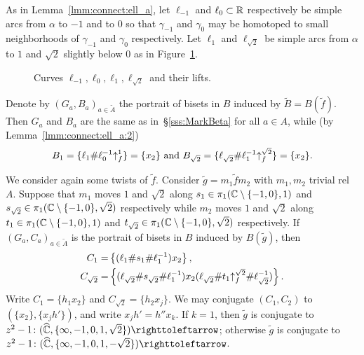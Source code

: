 \documentclass{amsart}
\newcommand\wtf{{\widetilde f}}
\newcommand\wtg{{\widetilde g}}
\newcommand\wtA{{\widetilde A}}
\newcommand\wtB{{\widetilde B}}
\begin{document}
As in Lemma~\ref{lmm:connect:ell_a}, let $\ell_{-1}$ and
$\ell_0\subset {\mathbb R}$ respectively be simple arcs from $\alpha$ to $-1$
and to $0$ so that $\gamma_{-1}$ and $\gamma_0$ may be homotoped to
small neighborhoods of $\gamma_{-1}$ and $\gamma_0$
respectively. Let $\ell_1$ and $\ell_{\sqrt2}$ be simple arcs from
$\alpha$ to $1$ and $\sqrt2$ slightly below $0$ as in
Figure~\ref{Fig:BasDynPl:2}.

\begin{figure}
  \caption{Curves $\ell_{-1},\ell_0,\ell_1,\ell_{\sqrt2}$ and their lifts.}
  \label{Fig:BasDynPl:2}
\end{figure}

Denote by $(G_a,B_a)_{a\in \wtA}$ the portrait of bisets in
$B$ induced by $\wtB=B(\wtf)$. Then $G_a$ and $B_a$
are the same as in~\S\ref{sss:MarkBeta} for all $a\in A$, while (by
Lemma~\ref{lmm:connect:ell_a:2})
\[B_1=\{\ell_1\#\ell_0^{-1}{\uparrow}_{f}^{1}\}=\{x_2\}\text{ and }B_{\sqrt2}=\{\ell_{\sqrt2}\#\ell_1^{-1}{\uparrow}_{f}^{\sqrt2}\}=\{x_2\}.\]

We consider again some twists of $\wtf$.  Consider
$\wtg=m_1\wtf m_2$ with $m_1,m_2$ trivial rel $A$. Suppose
that $m_1$ moves $1$ and $\sqrt2$ along
$s_1\in \pi_1({\mathbb C}\setminus\{-1,0\},1)$ and
$s_{\sqrt2}\in \pi_1({\mathbb C}\setminus\{-1,0\},\sqrt2)$ respectively
while $m_2$ moves $1$ and $\sqrt2$ along
$t_1\in \pi_1({\mathbb C}\setminus\{-1,0\},1)$ and
$t_{\sqrt2}\in \pi_1({\mathbb C}\setminus\{-1,0\},\sqrt2)$ respectively. If
$(G_a,C_a)_{a\in \wtA}$ is the portrait of bisets in $B$
induced by $B(\wtg)$, then
\begin{align*}
  C_1=&\left\{(\ell_1\#s_1\#\ell^{-1}_1)x_2\right\},\\
  C_{\sqrt2}=&\left\{(\ell_{\sqrt2}\#s_{\sqrt2}\#\ell^{-1}_1)x_2 (\ell_{\sqrt2}\#t_1{\uparrow}_{f}^{\sqrt2} \#\ell^{-1}_{\sqrt2})\right\}.
\end{align*}
Write $C_1=\{h_1 x_2\}$ and $C_{\sqrt2}=\{h_2 x_j\}$. We may
conjugate $(C_1,C_2)$ to $(\{x_2\},\{x_j h'\})$, and write
$x_j h'=h'' x_k$. If $k=1$, then $\wtg$ is conjugate to
${z^2-1\colon(\widehat\C,\{\infty, -1,0,1,\sqrt2\})\selfmap}$;
otherwise $\wtg$ is conjugate to
${z^2-1\colon(\widehat\C,\{\infty, -1,0,1,-\sqrt2\})\selfmap}$.
\end{document}
